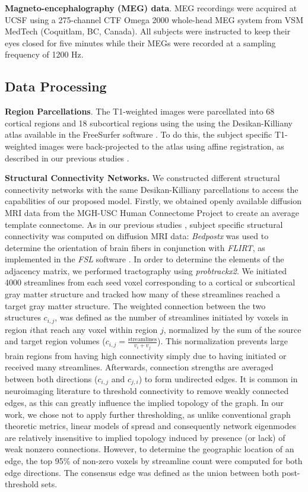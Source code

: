 \textbf{Magneto-encephalography (MEG) data}. MEG recordings were
acquired at UCSF using a 275-channel CTF Omega 2000 whole-head MEG
system from VSM MedTech (Coquitlam, BC, Canada). All subjects were
instructed to keep their eyes closed for five minutes while their MEGs
were recorded at a sampling frequency of 1200 Hz.

\subsection{Data Processing}

\textbf{Region Parcellations}. The T1-weighted images were parcellated
into 68 cortical regions and 18 subcortical regions using the using the
Desikan-Killiany atlas available in the FreeSurfer software
\cite{Fischl2002}. To do this, the subject specific T1-weighted
images were back-projected to the atlas using affine registration, as
described in our previous studies \cite{abdelnour_network_2014,owen_structural_2013}.

\textbf{Structural Connectivity Networks.} We constructed different
structural connectivity networks with the same Desikan-Killiany
parcellations to access the capabilities of our proposed model. Firstly,
we obtained openly available diffusion MRI data from the MGH-USC Human
Connectome Project to create an average template connectome. As in our
previous studies \cite{abdelnour_network_2014,owen_structural_2013}, subject specific structural
connectivity was computed on diffusion MRI data: \emph{Bedpostx} was
used to determine the orientation of brain fibers in conjunction with
\emph{FLIRT}, as implemented in the \emph{FSL} software
\cite{Jenkinson2012}. In order to determine the elements of the
adjacency matrix, we performed tractography using \emph{probtrackx2}. We
initiated 4000 streamlines from each seed voxel corresponding to a
cortical or subcortical gray matter structure and tracked how many of
these streamlines reached a target gray matter structure. The weighted
connection between the two structures $c_{i,j}$, was defined as the
number of streamlines initiated by voxels in region $i$that
reach any voxel within region $j$, normalized by the sum of the source
and target region volumes
($c_{i,j} = \frac{\textrm{streamlines}}{v_{i} + v_{j}}$). This
normalization prevents large brain regions from having high connectivity
simply due to having initiated or received many streamlines. Afterwards,
connection strengths are averaged between both directions ($c_{i,j}$
and $c_{j,i}$) to form undirected edges. It is common in neuroimaging
literature to threshold connectivity to remove weakly connected edges,
as this can greatly influence the implied topology of the graph. In our
work, we chose not to apply further thresholding, as unlike conventional
graph theoretic metrics, linear models of spread and consequently
network eigenmodes are relatively insensitive to implied topology
induced by presence (or lack) of weak nonzero connections. However, to
determine the geographic location of an edge, the top 95\% of non-zero
voxels by streamline count were computed for both edge directions. The
consensus edge was defined as the union between both post-threshold
sets.

